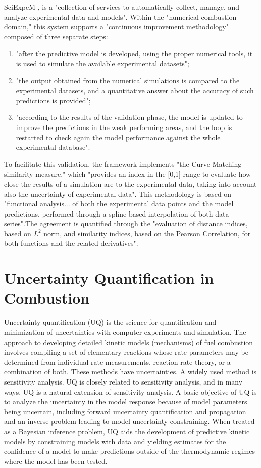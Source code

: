 SciExpeM \cite{ramalli_data_2021}, is a "collection of services to automatically collect, manage, and analyze experimental data and models". Within the "numerical combustion domain," this system supports a "continuous improvement methodology" composed of three separate steps:
\begin{enumerate}
	\item "after the predictive model is developed, using the proper numerical tools, it is used to simulate the available experimental datasets";
	\item "the output obtained from the numerical simulations is compared to the experimental datasets, and a quantitative answer about the accuracy of such predictions is provided";
	\item "according to the results of the validation phase, the model is updated to improve the predictions in the weak performing areas, and the loop is restarted to check again the model performance against the whole experimental database".
\end{enumerate}To facilitate this validation, the framework implements "the Curve Matching similarity measure," which "provides an index in the [0,1] range to evaluate how close the results of a simulation are to the experimental data, taking into account also the uncertainty of experimental data". This methodology is based on "functional analysis... of both the experimental data points and the model predictions, performed through a spline based interpolation of both data series".The agreement is quantified through the "evaluation of distance indices, based on $L^2$ norm, and similarity indices, based on the Pearson Correlation, for both functions and the related derivatives".


\section{Uncertainty Quantification in Combustion}
Uncertainty quantification (UQ) is the science for quantification and minimization of uncertainties with computer experiments and simulation. \cite{wang_combustion_2015} The approach to developing detailed kinetic models (mechanisms) of fuel combustion involves compiling a set of elementary reactions whose rate parameters may be determined from individual rate measurements, reaction rate theory, or a combination of both. These methods have uncertainties. A widely used method is sensitivity analysis. UQ is closely related to sensitivity analysis, and in many ways, UQ is a natural extension of sensitivity analysis. A basic objective of UQ is to analyze the uncertainty in the model response because of model parameters being uncertain, including forward uncertainty quantification and propagation and an inverse problem leading to model uncertainty constraining. When treated as a Bayesian inference problem, UQ aids the development of predictive kinetic models by constraining models with data and yielding estimates for the confidence of a model to make predictions outside of the thermodynamic regimes where the model has been tested. \cite{wang_combustion_2015}


